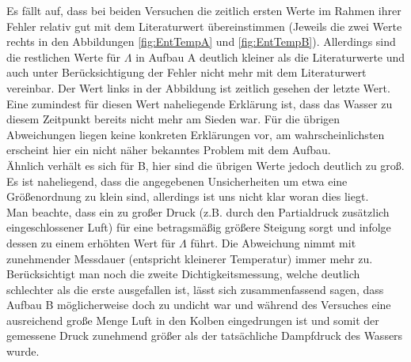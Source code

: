 \documentclass[12pt,a4paper]{article}
\begin{document}
Es fällt auf, dass bei beiden Versuchen die zeitlich ersten Werte im Rahmen ihrer Fehler relativ gut mit dem Literaturwert übereinstimmen (Jeweils die zwei Werte rechts in den Abbildungen \ref{fig:EntTempA} und \ref{fig:EntTempB}).
Allerdings sind die restlichen Werte für $\Lambda$ in Aufbau A deutlich kleiner als die Literaturwerte und auch unter Berücksichtigung der Fehler nicht mehr mit dem Literaturwert vereinbar. Der Wert links in der Abbildung ist zeitlich gesehen der letzte Wert. Eine zumindest für diesen Wert naheliegende Erklärung ist, dass das Wasser zu diesem Zeitpunkt bereits nicht mehr am Sieden war. Für die übrigen Abweichungen liegen keine konkreten Erklärungen vor, am wahrscheinlichsten erscheint hier ein nicht näher bekanntes Problem mit dem Aufbau. \\
Ähnlich verhält es sich für B, hier sind die übrigen Werte jedoch deutlich zu groß.\\
Es ist naheliegend, dass die angegebenen Unsicherheiten um etwa eine Größenordnung zu klein sind, allerdings ist uns nicht klar woran dies liegt.\\
Man beachte, dass ein zu großer Druck (z.B. durch den Partialdruck zusätzlich eingeschlossener Luft) für eine betragsmäßig größere Steigung sorgt und infolge dessen zu einem erhöhten Wert für $\Lambda$ führt.
Die Abweichung nimmt mit zunehmender Messdauer (entspricht kleinerer Temperatur) immer mehr zu. Berücksichtigt man noch die zweite Dichtigkeitsmessung, welche deutlich schlechter als die erste ausgefallen ist, lässt sich zusammenfassend sagen, dass Aufbau B möglicherweise doch zu undicht war und während des Versuches eine ausreichend große Menge Luft in den Kolben eingedrungen ist und somit der gemessene Druck zunehmend größer als der tatsächliche Dampfdruck des Wassers wurde.\\
\end{document}
